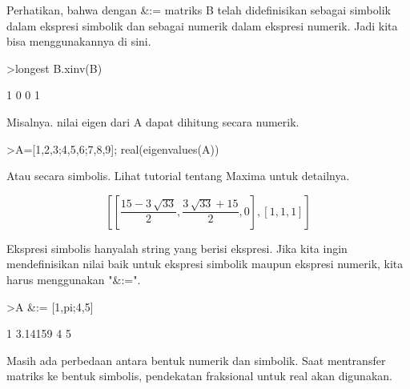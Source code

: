 \documentclass[a4paper,10pt]{article}
\begin{document}
\begin{eulernotebook}
\begin{eulercomment}
\begin{eulercomment}
\begin{eulercomment}
\begin{eulercomment}
\begin{eulercomment}
\begin{eulercomment}
\begin{eulercomment}
Perhatikan, bahwa dengan \&:= matriks B telah didefinisikan sebagai
simbolik dalam ekspresi simbolik dan sebagai numerik dalam ekspresi
numerik. Jadi kita bisa menggunakannya di sini.
\end{eulercomment}
\begin{eulerprompt}
>longest B.xinv(B)
\end{eulerprompt}
\begin{euleroutput}
                        1                       0 
                        0                       1 
\end{euleroutput}
\begin{eulercomment}
Misalnya. nilai eigen dari A dapat dihitung secara numerik.
\end{eulercomment}
\begin{eulerprompt}
>A=[1,2,3;4,5,6;7,8,9]; real(eigenvalues(A))
\end{eulerprompt}
\begin{euleroutput}
  [16.1168,  -1.11684,  0]
\end{euleroutput}
\begin{eulercomment}
Atau secara simbolis. Lihat tutorial tentang Maxima untuk detailnya.
\end{eulercomment}
\begin{eulerformula}
\[
\left[ \left[ \frac{15-3\,\sqrt{33}}{2} , \frac{3\,\sqrt{33}+15}{2}   , 0 \right]  , \left[ 1 , 1 , 1 \right]  \right] 
\]
\end{eulerformula}
\begin{eulercomment}
Ekspresi simbolis hanyalah string yang berisi ekspresi. Jika kita
ingin mendefinisikan nilai baik untuk ekspresi simbolik maupun
ekspresi numerik, kita harus menggunakan "\&:=".
\end{eulercomment}
\begin{eulerprompt}
>A &:= [1,pi;4,5]
\end{eulerprompt}
\begin{euleroutput}
              1       3.14159 
              4             5 
\end{euleroutput}
\begin{eulercomment}
Masih ada perbedaan antara bentuk numerik dan simbolik. Saat
mentransfer matriks ke bentuk simbolis, pendekatan fraksional untuk
real akan digunakan.
\end{eulercomment}
\begin{eulerprompt}

\end{eulerprompt}
\end{eulercomment}
\end{eulercomment}
\end{eulercomment}
\end{eulercomment}
\end{eulercomment}
\end{eulercomment}
\end{eulernotebook}
\end{document}
